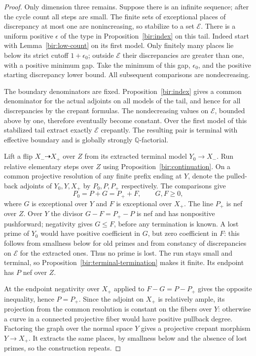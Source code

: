 \documentclass[11pt,letterpaper]{article}
\newcommand{\Q}{\mathbb{Q}}
\theoremstyle{definition}
\theoremstyle{remark}
\begin{document}
\begin{proof}
Only dimension three remains.  Suppose there is an infinite
sequence; after the cycle count all steps are small.  The finite sets
of exceptional places of discrepancy at most one are nonincreasing,
so stabilize to a set $\mathcal E$.  There is a uniform positive
$\epsilon$ of the type in Proposition~\ref{bir:index} on this tail.
Indeed start with Lemma~\ref{bir:low-count} on its first model.  Only
finitely many places lie below its strict cutoff $1+\epsilon_0$;
outside $\mathcal E$ their discrepancies are greater than one, with
a positive minimum gap.  Take the minimum of this gap,
$\epsilon_0$, and the positive starting discrepancy lower bound.
All subsequent comparisons are nondecreasing.

The boundary denominators are fixed.  Proposition~\ref{bir:index}
gives a common denominator for the actual adjoints on all models of
the tail, and hence for all discrepancies by the crepant formulas.
The nondecreasing values on $\mathcal E$, bounded above by one,
therefore eventually become constant.  Over the first model of this
stabilized tail extract exactly $\mathcal E$ crepantly.  The
resulting pair is terminal with effective boundary and is globally
strongly $\Q$-factorial.

Lift a flip $X_-\dashrightarrow X_+$ over $Z$ from its extracted
terminal model $Y_0\to X_-$.  Run relative elementary steps over $Z$
using Proposition~\ref{bir:continuation}.  On a common projective
resolution of any finite prefix ending at $Y$, denote the pulled-back
adjoints of $Y_0,Y,X_+$ by $P_0,P,P_+$ respectively.  The comparisons
give
\begin{equation}
 P_0=P+G=P_++F,
 \qquad G,F\geq0,
 \label{bir:terminal-lift}
\end{equation}
where $G$ is exceptional over $Y$ and $F$ is exceptional over $X_+$.
The line $P_+$ is nef over $Z$.  Over $Y$ the divisor
$G-F=P_+-P$ is nef and has nonpositive pushforward; negativity gives
$G\leq F$, before any termination is known.  A lost prime of $Y_0$
would have positive coefficient in $G$, but zero coefficient in $F$:
this follows from smallness below for old primes and from constancy
of discrepancies on $\mathcal E$ for the extracted ones.  Thus no
prime is lost.  The run stays small and terminal, so
Proposition~\ref{bir:terminal-termination} makes it finite.  Its
endpoint has $P$ nef over $Z$.

At the endpoint negativity over $X_+$ applied to $F-G=P-P_+$ gives
the opposite inequality, hence $P=P_+$.  Since the adjoint on $X_+$
is relatively ample, its projection from the common resolution is
constant on the fibers over $Y$: otherwise a curve in a connected
projective fiber would have positive pullback degree.  Factoring the
graph over the normal space $Y$ gives a projective crepant morphism
$Y\to X_+$.  It extracts the same places, by smallness below and the
absence of lost primes, so the construction repeats.


\end{proof}
\end{document}
